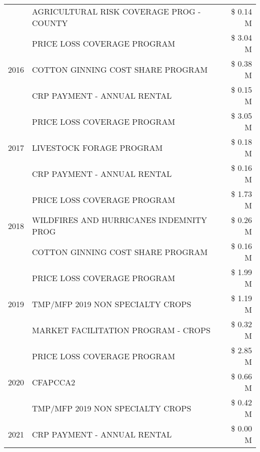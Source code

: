 \begin{tabular}{llr}
 & AGRICULTURAL RISK COVERAGE PROG - COUNTY & \$ 0.14 M \\
\cline{1-3}
\multirow[t]{3}{*}{2016} & PRICE LOSS COVERAGE PROGRAM                   & \$ 3.04 M \\
 & COTTON GINNING COST SHARE PROGRAM             & \$ 0.38 M \\
 & CRP PAYMENT - ANNUAL RENTAL                   & \$ 0.15 M \\
\cline{1-3}
\multirow[t]{3}{*}{2017} & PRICE LOSS COVERAGE PROGRAM & \$ 3.05 M \\
 & LIVESTOCK FORAGE PROGRAM & \$ 0.18 M \\
 & CRP PAYMENT - ANNUAL RENTAL & \$ 0.16 M \\
\cline{1-3}
\multirow[t]{3}{*}{2018} & PRICE LOSS COVERAGE PROGRAM & \$ 1.73 M \\
 & WILDFIRES AND HURRICANES INDEMNITY PROG & \$ 0.26 M \\
 & COTTON GINNING COST SHARE PROGRAM & \$ 0.16 M \\
\cline{1-3}
\multirow[t]{3}{*}{2019} & PRICE LOSS COVERAGE PROGRAM & \$ 1.99 M \\
 & TMP/MFP 2019 NON SPECIALTY CROPS & \$ 1.19 M \\
 & MARKET FACILITATION PROGRAM - CROPS & \$ 0.32 M \\
\cline{1-3}
\multirow[t]{3}{*}{2020} & PRICE LOSS COVERAGE PROGRAM & \$ 2.85 M \\
 & CFAPCCA2 & \$ 0.66 M \\
 & TMP/MFP 2019 NON SPECIALTY CROPS & \$ 0.42 M \\
\cline{1-3}
2021 & CRP PAYMENT - ANNUAL RENTAL & \$ 0.00 M \\
\cline{1-3}
\bottomrule
\end{tabular}

